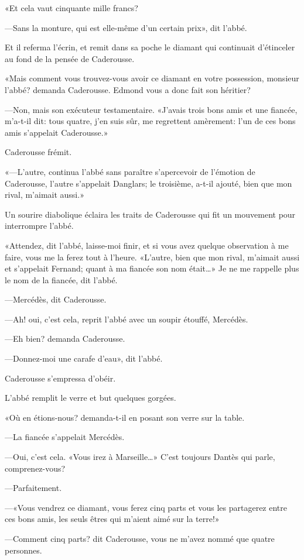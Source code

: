 «Et cela vaut cinquante mille francs?

—Sans la monture, qui est elle-même d'un certain prix», dit l'abbé.

Et il referma l'écrin, et remit dans sa poche le diamant qui continuait d'étinceler au fond de la pensée de Caderousse.

«Mais comment vous trouvez-vous avoir ce diamant en votre possession, monsieur l'abbé? demanda Caderousse. Edmond vous a donc fait son héritier?

—Non, mais son exécuteur testamentaire. «J'avais trois bons amis et une fiancée, m'a-t-il dit: tous quatre, j'en suis sûr, me regrettent amèrement: l'un de ces bons amis s'appelait Caderousse.»

Caderousse frémit.

«—L'autre, continua l'abbé sans paraître s'apercevoir de l'émotion de Caderousse, l'autre s'appelait Danglars; le troisième, a-t-il ajouté, bien que mon rival, m'aimait aussi.»

Un sourire diabolique éclaira les traits de Caderousse qui fit un mouvement pour interrompre l'abbé.

«Attendez, dit l'abbé, laisse-moi finir, et si vous avez quelque observation à me faire, vous me la ferez tout à l'heure. «L'autre, bien que mon rival, m'aimait aussi et s'appelait Fernand; quant à ma fiancée son nom était\dots» Je ne me rappelle plus le nom de la fiancée, dit l'abbé.

—Mercédès, dit Caderousse.

—Ah! oui, c'est cela, reprit l'abbé avec un soupir étouffé, Mercédès.

—Eh bien? demanda Caderousse.

—Donnez-moi une carafe d'eau», dit l'abbé.

Caderousse s'empressa d'obéir.

L'abbé remplit le verre et but quelques gorgées.

«Où en étions-nous? demanda-t-il en posant son verre sur la table.

—La fiancée s'appelait Mercédès.

—Oui, c'est cela. «Vous irez à Marseille\dots» C'est toujours Dantès qui parle, comprenez-vous?

—Parfaitement.

—«Vous vendrez ce diamant, vous ferez cinq parts et vous les partagerez entre ces bons amis, les seuls êtres qui m'aient aimé sur la terre!»

—Comment cinq parts? dit Caderousse, vous ne m'avez nommé que quatre personnes.

